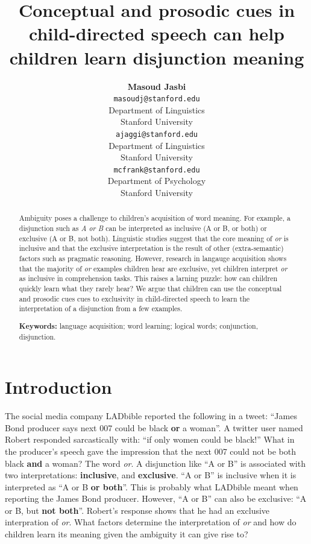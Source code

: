 \documentclass[10pt, letterpaper]{article}
\title{Conceptual and prosodic cues in child-directed speech can help children
learn disjunction meaning}
\author{{\large \bf Masoud Jasbi} \\ \texttt{masoudj@stanford.edu} \\ Department of Linguistics \\ Stanford University \And {\large \bf Akshay Jaggi} \\ \texttt{ajaggi@stanford.edu} \\ Department of Linguistics \\ Stanford University \And {\large \bf Michael C. Frank} \\ \texttt{mcfrank@stanford.edu} \\ Department of Psychology \\ Stanford University }
\begin{document}
\maketitle

\begin{abstract}
Ambiguity poses a challenge to children's acquisition of word meaning.
For example, a disjunction such as \emph{A or B} can be interpreted as
inclusive (A or B, or both) or exclusive (A or B, not both). Linguistic
studies suggest that the core meaning of \emph{or} is inclusive and that
the exclusive interpretation is the result of other (extra-semantic)
factors such as pragmatic reasoning. However, research in langauge
acquisition shows that the majority of \emph{or} examples children hear
are exclusive, yet children interpret \emph{or} as inclusive in
comprehension tasks. This raises a larning puzzle: how can children
quickly learn what they rarely hear? We argue that children can use the
conceptual and prosodic cues cues to exclusivity in child-directed
speech to learn the interpretation of a disjunction from a few examples.

\textbf{Keywords:}
language acquisition; word learning; logical words; conjunction,
disjunction.
\end{abstract}

\section{Introduction}\label{introduction}

The social media company LADbible reported the following in a tweet:
``James Bond producer says next 007 could be black \textbf{or} a
woman''. A twitter user named Robert responded sarcastically with: ``if
only women could be black!'' What in the producer's speech gave the
impression that the next 007 could not be both black \textbf{and} a
woman? The word \emph{or}. A disjunction like ``A or B'' is associated
with two interpretations: \textbf{inclusive}, and \textbf{exclusive}.
``A or B'' is inclusive when it is interpreted as ``A or B \textbf{or
both}''. This is probably what LADbible meant when reporting the James
Bond producer. However, ``A or B'' can also be exclusive: ``A or B, but
\textbf{not both}''. Robert's response shows that he had an exclusive
interpration of \emph{or}. What factors determine the interpretation of
\emph{or} and how do children learn its meaning given the ambiguity it
can give rise to?
\end{document}
